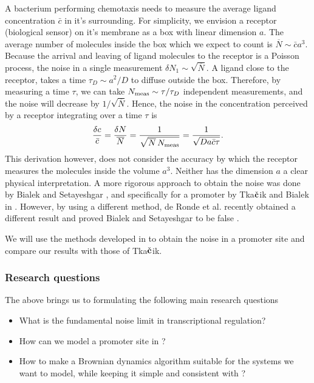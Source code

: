 A bacterium performing chemotaxis needs to measure the average ligand concentration $\bar{c}$ in it's surrounding. For simplicity, we envision a receptor (biological sensor) on it's membrane as a box with linear dimension $a$. The average number of molecules inside the box which we expect to count is $\overline{N} \sim \bar{c} a^3$. Because the arrival and leaving of ligand molecules to the receptor is a Poisson process, the noise in a single measurement $\delta N_1 \sim \sqrt{\overline{N}}$. A ligand close to the receptor, takes a time $\tau_D \sim a^2/D$ to diffuse outside the box. Therefore, by measuring a time $\tau$, we can take $N_{\rm meas} \sim \tau/\tau_D$ independent measurements, and the noise will decrease by $1/\sqrt{\overline{N}}$. Hence, the noise in the concentration perceived by a receptor integrating over a time $\tau$ is
\begin{equation}
 \frac{\delta c}{\bar{c}} = \frac{\delta N}{\overline{N}} = \frac{1}{\sqrt{\overline{N}\,N_{\rm meas}}} = \frac{1}{\sqrt{D a \bar{c} \tau}}.
\end{equation}
This derivation however, does not consider the accuracy by which the receptor measures the molecules inside the volume $a^3$. Neither has the dimension $a$ a clear physical interpretation. A more rigorous approach to obtain the noise was done by Bialek and Setayeshgar \cite{Bialek2005}, and specifically for a promoter by Tka$\check{\bf c}$ik and Bialek in \cite{Tkacik2009}. However, by using a different method, de Ronde et al. recently obtained a different result and proved Bialek and Setayeshgar to be false \cite{DeRonde2012}.

We will use the methods developed in \cite{DeRonde2012} to obtain the noise in a promoter site and compare our results with those of Tka$\check{\bf c}$ik.

\subsubsection{Research questions}
The above brings us to formulating the following main research questions
\begin{itemize}
 \item What is the fundamental noise limit in transcriptional regulation?
 \item How can we model a promoter site in \GFRD?
 \item How to make a Brownian dynamics algorithm suitable for the systems we want to model, while keeping it simple and consistent with \GFRD?
\end{itemize}



